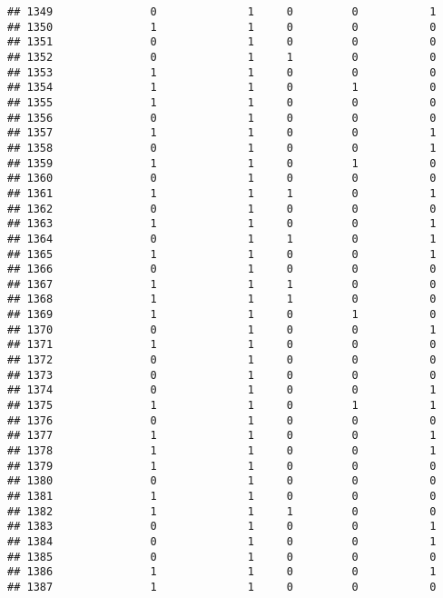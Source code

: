 \documentclass[]{article}
\begin{document}
\begin{verbatim}
## 1349               0              1     0         0           1
## 1350               1              1     0         0           0
## 1351               0              1     0         0           0
## 1352               0              1     1         0           0
## 1353               1              1     0         0           0
## 1354               1              1     0         1           0
## 1355               1              1     0         0           0
## 1356               0              1     0         0           0
## 1357               1              1     0         0           1
## 1358               0              1     0         0           1
## 1359               1              1     0         1           0
## 1360               0              1     0         0           0
## 1361               1              1     1         0           1
## 1362               0              1     0         0           0
## 1363               1              1     0         0           1
## 1364               0              1     1         0           1
## 1365               1              1     0         0           1
## 1366               0              1     0         0           0
## 1367               1              1     1         0           0
## 1368               1              1     1         0           0
## 1369               1              1     0         1           0
## 1370               0              1     0         0           1
## 1371               1              1     0         0           0
## 1372               0              1     0         0           0
## 1373               0              1     0         0           0
## 1374               0              1     0         0           1
## 1375               1              1     0         1           1
## 1376               0              1     0         0           0
## 1377               1              1     0         0           1
## 1378               1              1     0         0           1
## 1379               1              1     0         0           0
## 1380               0              1     0         0           0
## 1381               1              1     0         0           0
## 1382               1              1     1         0           0
## 1383               0              1     0         0           1
## 1384               0              1     0         0           1
## 1385               0              1     0         0           0
## 1386               1              1     0         0           1
## 1387               1              1     0         0           0

\end{verbatim}
\end{document}
